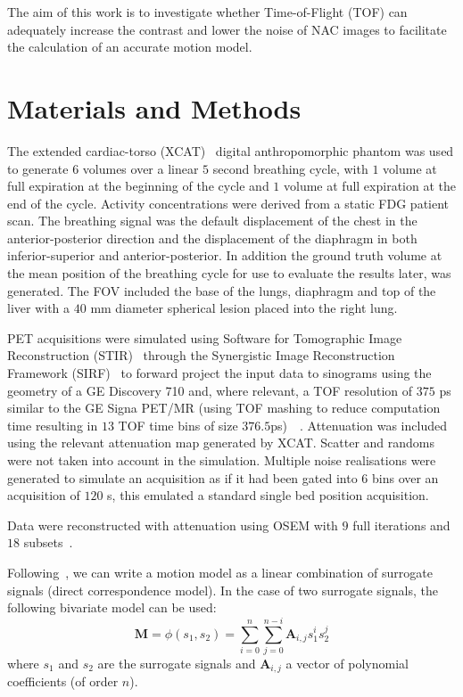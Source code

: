 \documentclass[journal]{IEEEtran}
\begin{document}
The aim of this work is to investigate whether Time-of-Flight (TOF) can adequately increase the contrast and lower the noise of NAC images to facilitate the calculation of an accurate motion model.

\section{Materials and Methods}
The extended cardiac-torso (XCAT)~\cite{Segars2009} digital anthropomorphic phantom was used to generate $6$ volumes over a linear $5$ second breathing cycle, with $1$ volume at full expiration at the beginning of the cycle and $1$ volume at full expiration at the end of the cycle. Activity concentrations were derived from a static FDG patient scan. The breathing signal was the default displacement of the chest in the anterior-posterior direction and the displacement of the diaphragm in both inferior-superior and anterior-posterior. In addition the ground truth volume at the mean position of the breathing cycle for use to evaluate the results later, was generated. The FOV included the base of the lungs, diaphragm and top of the liver with a $40$ mm diameter spherical lesion placed into the right lung.

PET acquisitions were simulated using Software for Tomographic Image Reconstruction (STIR)~\cite{Thielemans2012} through the Synergistic Image Reconstruction Framework (SIRF)~\cite{Ovtchinnikov2017} to forward project the input data to sinograms using the geometry of a GE Discovery 710 and, where relevant, a TOF resolution of $375$ ps similar to the GE Signa PET/MR (using TOF mashing to reduce computation time resulting in $13$ TOF time bins of size $376.5$ps)~\cite{Efthimiou2017}~\cite{Efthimiou2018}. Attenuation was included using the relevant attenuation map generated by XCAT. Scatter and randoms were not taken into account in the simulation. Multiple noise realisations were generated to simulate an acquisition as if it had been gated into $6$ bins over an acquisition of $120$ s, this emulated a standard single bed position acquisition.

Data were reconstructed with attenuation using OSEM with $9$ full iterations and $18$ subsets~\cite{Hudson1994}. 

Following~\cite{McClelland2013}, we can write a motion model as a linear combination of surrogate signals (direct correspondence model). In the case of two surrogate signals, the following bivariate model can be used:
\begin{equation}
    \bm{M} = \phi(s_1,s_2)=\sum_{i=0}^{n}\sum_{j=0}^{n-i}\bm{A}_{i,j}s_1^i s_2^j
\end{equation}
\noindent where $s_1$ and $s_2$ are the surrogate signals and $\bm{A}_{i,j}$ a vector of polynomial coefficients (of order $n$). 
\end{document}
